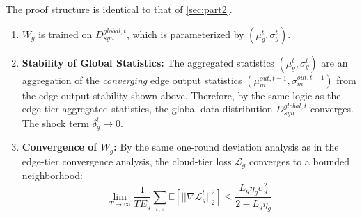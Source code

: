 The proof structure is identical to that of \cref{sec:part2}.
\begin{enumerate}
    \item $W_g$ is trained on $D_{syn}^{global, t}$, which is parameterized by $(\mu_g^t, \sigma_g^t)$.
    \item \textbf{Stability of Global Statistics:} The aggregated statistics $(\mu_g^t, \sigma_g^t)$ are an aggregation of the \textit{converging} edge output statistics $(\mu_m^{out, t-1}, \sigma_m^{out, t-1})$ from the edge output stability shown above. Therefore, by the same logic as the edge-tier aggregated statistics, the global data distribution $D_{syn}^{global, t}$ converges. The shock term $\delta_g^t \to 0$.
    \item \textbf{Convergence of $W_g$:} By the same one-round deviation analysis as in the edge-tier convergence analysis, the cloud-tier loss $\mathcal{L}_g$ converges to a bounded neighborhood:
    $$ \lim_{T \to \infty} \frac{1}{T E_g} \sum_{t,e} \mathbb{E}[||\nabla \mathcal{L}_g^t||_2^2] \le \frac{L_g \eta_g \sigma_g^2}{2 - L_g \eta_g} $$
\end{enumerate}
